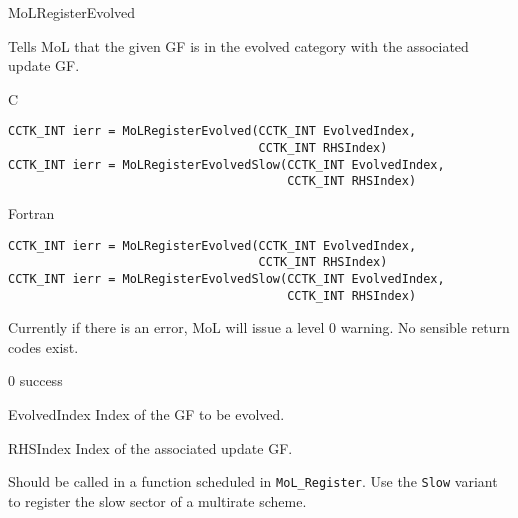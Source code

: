 \begin{FunctionDescription}{MoLRegisterEvolved}
  \label{CactusBase_MoL_MoLRegisterEvolved}
  
  Tells MoL that the given GF is in the evolved category with the
  associated update GF.

  \begin{SynopsisSection}
    \begin{Synopsis}{C}
\begin{verbatim}
CCTK_INT ierr = MoLRegisterEvolved(CCTK_INT EvolvedIndex, 
                                   CCTK_INT RHSIndex)
CCTK_INT ierr = MoLRegisterEvolvedSlow(CCTK_INT EvolvedIndex, 
                                       CCTK_INT RHSIndex)
\end{verbatim}
    \end{Synopsis}
    \begin{Synopsis}{Fortran}
\begin{verbatim}
CCTK_INT ierr = MoLRegisterEvolved(CCTK_INT EvolvedIndex,
                                   CCTK_INT RHSIndex)
CCTK_INT ierr = MoLRegisterEvolvedSlow(CCTK_INT EvolvedIndex,
                                       CCTK_INT RHSIndex)
\end{verbatim}
    \end{Synopsis}
  \end{SynopsisSection}

  \begin{ResultSection}
    \begin{ResultNote}
      Currently if there is an error, MoL will issue a level 0
      warning. No sensible return codes exist.
    \end{ResultNote}
    \begin{Result}{\rm 0}
      success
    \end{Result}
  \end{ResultSection}

  \begin{ParameterSection}
    \begin{Parameter}{EvolvedIndex}
      Index of the GF to be evolved.
    \end{Parameter}
    \begin{Parameter}{RHSIndex}
      Index of the associated update GF.
    \end{Parameter}
  \end{ParameterSection}

  \begin{Discussion}
    Should be called in a function scheduled in {\tt MoL\_Register}. Use the
    {\tt Slow} variant to register the slow sector of a multirate scheme.
  \end{Discussion}


\end{FunctionDescription}
